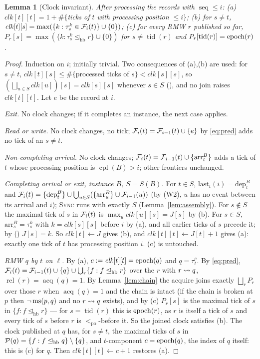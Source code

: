 \documentclass[11pt]{article}
\newtheorem{lemma}[theorem]{Lemma}
\theoremstyle{remark}
\DeclareMathOperator{\tid}{tid}\DeclareMathOperator{\pc}{pc}\DeclareMathOperator{\seq}{seq}
\DeclareMathOperator{\rel}{rel}\DeclareMathOperator{\acq}{acq}\DeclareMathOperator{\key}{key}
\DeclareMathOperator{\cpl}{cpl}\DeclareMathOperator{\Exec}{Exec}\DeclareMathOperator{\rf}{rf}
\newcommand{\PO}{<_{\mathrm{po}}}\newcommand{\HB}{\to_{\mathrm{hb}}}\newcommand{\HBr}{\trianglelefteq_{\mathrm{hb}}}
\newcommand{\arr}[2]{\mathrm{arr}^{#2}_{#1}}\newcommand{\dep}[2]{\mathrm{dep}^{#2}_{#1}}\newcommand{\ext}[1]{\mathrm{exit}_{#1}}
\newcommand{\clk}{\mathit{clk}}\newcommand{\Bk}{B}\newcommand{\Ch}{\mathit{Ch}}\newcommand{\lastr}{\mathit{last}}
\begin{document}
\begin{lemma}[Clock invariant]\label{lem:vc}
After processing the records with $\seq\le i$: (a) $\clk[t][t]=1+\#\{$ticks of $t$ with
processing position $\le i\}$; (b) for $s\ne t$, $\clk[t][s]=\max(\{k:\tau^k_s\in\Fr_i(t)\}\cup\{0\})$;
(c) for every RMW $r$ published so far, $P_r[s]=\max(\{k:\tau^k_s\HBr r\}\cup\{0\})$
for $s\ne\tid(r)$ and $P_r[\tid(r)]=\epoch(r)$.
\end{lemma}
\begin{proof}
Induction on $i$; initially trivial. Two consequences of (a),(b) are used: for $s\ne t$,
$\clk[t][s]\le\#\{$processed ticks of $s\}<\clk[s][s]$, so $(\bigsqcup_{u\in S}\clk[u])[s]=\clk[s][s]$
whenever $s\in S$ (\dag), and no join raises $\clk[t][t]$. Let $e$ be the record at $i$.

\emph{Exit.} No clock changes; if it completes an instance, the next case applies.

\emph{Read or write.} No clock changes, no tick; $\mathcal{F}_i(t)=\mathcal{F}_{i-1}(t)\cup\{e\}$ by
\eqref{eq:pred} adds no tick of an $s\ne t$.

\emph{Non-completing arrival.} No clock changes; $\Fr_i(t)=\Fr_{i-1}(t)\cup\{\arr{t}{B}\}$
adds a tick of $t$ whose processing position is $\cpl(B)>i$; other frontiers unchanged.

\emph{Completing arrival or exit, instance $B$, $S=S(B)$.} For $t\in S$,
$\mathrm{last}_t(i)=\dep{t}{B}$ and $\Fr_i(t)=\{\dep{t}{B}\}\cup\bigcup_{u\in S}(\{\arr{u}{B}\}\cup\Fr_{i-1}(u))$
(by (W2), $u$ has no event between its arrival and $i$); \textsc{Sync} runs with exactly
$S$ (Lemma~\ref{lem:assembly}). For $s\notin S$ the maximal tick of $s$ in $\mathcal{F}_i(t)$ is
$\max_u\clk[u][s]=J[s]$ by (b). For $s\in S$, $\arr{s}{B}=\tau^k_s$ with $k=\clk[s][s]$
before $i$ by (a), and all earlier ticks of $s$ precede it; by (\dag) $J[s]=k$. So
$\clk[t]\gets J$ gives (b), and $\clk[t][t]\gets J[t]+1$ gives (a): exactly one tick of $t$
has processing position $i$. (c) is untouched.

\emph{RMW $q$ by $t$ on $\ell$.} By (a), $c:=\clk[t][t]=\epoch(q)$ and $q=\tau^c_t$. By
\eqref{eq:pred}, $\Fr_i(t)=\Fr_{i-1}(t)\cup\{q\}\cup\bigcup_r\{f:f\HBr r\}$ over the $r$ with
$r\rightsquigarrow q$, $\rel(r)=\acq(q)=1$. By Lemma~\ref{lem:chain} the acquire joins exactly
$\bigsqcup_r P_r$ over those $r$ when $\acq(q)=1$ and the chain is intact (if the chain is
broken at $p$ then $\neg\operatorname{ms}(p,q)$ and no $r\rightsquigarrow q$ exists), and by (c) $P_r[s]$ is the
maximal tick of $s$ in $\{f:f\HBr r\}$ --- for $s=\tid(r)$ this is $\operatorname{epoch}(r)$, as $r$ is
itself a tick of $s$ and every tick of $s$ before $r$ is $\PO$-before it. So the joined
clock satisfies (b). The clock published at $q$ has, for $s\ne t$, the maximal ticks of $s$
in $\Pred(q)=\{f:f\HBr q\}\setminus\{q\}$, and $t$-component $c=\operatorname{epoch}(q)$, the index of $q$
itself: this is (c) for $q$. Then $\clk[t][t]\gets c+1$ restores (a).
\end{proof}
\end{document}
